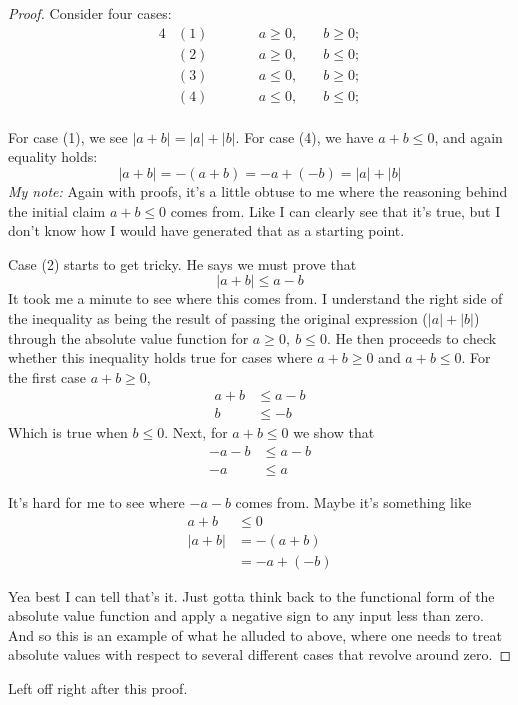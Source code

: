 \begin{proof}
    Consider four cases:
    \begin{alignat*}{4}
        &(1)\quad\quad&& a \geq 0, \quad & b \geq 0;\\
        &(2)\quad\quad && a \geq 0, \quad & b \leq 0;\\
        &(3)\quad\quad && a \leq 0, \quad & b \geq 0;\\
        &(4)\quad\quad && a \leq 0, \quad & b \leq 0;\\
    \end{alignat*} 

    For case (1), we see $\lvert a + b \rvert = \lvert a \rvert + \lvert b \rvert$.
    For case (4), we have $a+b \leq 0$, and again equality holds:
    \[
    \lvert a + b \rvert = -(a+b) = -a + (-b) = \lvert a \rvert + \lvert b \rvert
\]
    \emph{My note:} Again with proofs, it's a little obtuse to me where the reasoning
    behind the initial claim $a+b \leq 0$ comes from. Like I can clearly see that it's
    true, but I don't know how I would have generated that as a starting point.

    Case (2) starts to get tricky. He says we must prove that
    \[
    \lvert a + b \rvert \leq a - b
    \]  
    It took me a minute to see where this comes from. I understand the right side of the
    inequality as being the result of passing the original expression ($\lvert a \rvert +
    \lvert b \rvert$) through the absolute value function for $a \geq 0,~b \leq 0$. He
    then proceeds to check whether this inequality holds true for cases where $a + b \geq 0$
    and $a + b \leq 0$. For the first case $a + b \geq 0$,
    \begin{align*}
        a + b &\leq a - b\\
        b &\leq -b
    \end{align*}
    Which is true when $b \leq 0$. Next, for $a + b \leq 0$ we show that
    \begin{align*}
        -a - b &\leq a - b\\
        -a &\leq a
    \end{align*}

    It's hard for me to see where $-a - b$ comes from. Maybe it's something like
    \begin{align*}
        a + b &\leq 0\\
        \lvert a + b \rvert &= -(a + b)\\
        &= -a + (-b)
    \end{align*}

    Yea best I can tell that's it. Just gotta think back to the functional form of the
    absolute value function and apply a negative sign to any input less than zero. And so
    this is an example of what he alluded to above, where one needs to treat absolute
    values with respect to several different cases that revolve around zero.
        
\end{proof}

Left off right after this proof.
